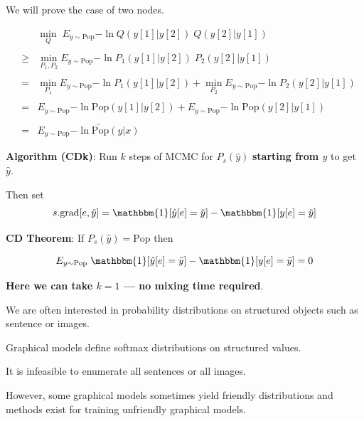 {

We will prove the case of two nodes.

\vfill
\begin{eqnarray*}
  & & \min_Q \;E_{y\sim \mathrm{Pop}}{-\ln Q(y[1]|y[2])\;Q(y[2]|y[1])} \\
  \\
  & \geq & \min_{P_1,P_2} E_{y \sim \mathrm{Pop}}{-\ln P_1(y[1]|y[2])\;P_2(y[2]|y[1])} \\
  \\
  & = & \min_{P_1} E_{y \sim \mathrm{Pop}}{-\ln P_1(y[1]|y[2])} + \min_{P_2} E_{y \sim \mathrm{Pop}}{-\ln P_2(y[2]|y[1])} \\
  \\
  & = & E_{y \sim \mathrm{Pop}}{-\ln \mathrm{Pop}(y[1]|y[2])} + E_{y \sim \mathrm{Pop}}{-\ln \mathrm{Pop}(y[2]|y[1])} \\
  \\
  & = & E_{y \sim \mathrm{Pop}}{-\ln \widetilde{\mathrm{Pop}}(y|x)}
\end{eqnarray*}

  
{\bf Algorithm (CDk)}: Run $k$ steps of MCMC for $P_s(\hat{y})$ {\bf starting from $y$} to get $\hat{y}$.

\vfill
Then set
$$s.\mathrm{grad}[e,\tilde{y}] = \mathbbm{1}[\hat{y}[e] = \tilde{y}] - \mathbbm{1}[y[e]= \tilde{y}]$$

\vfill
    {\bf CD Theorem}: If $P_s(\hat{y}) = \mathrm{Pop}$ then
    
    $$E_{y \sim \mathrm{Pop}}\; \mathbbm{1}[\hat{y}[e] = \tilde{y}] - \mathbbm{1}[y[e]= \tilde{y}] = 0$$

\vfill
{\bf Here we can take $k=1$ --- \bf no mixing time required}.


We are often interested in probability distributions on structured objects such as sentence or images.

\vfill
Graphical models define softmax distributions on structured values.

\vfill
It is infeasible to enumerate all sentences or all images.

\vfill
However, some graphical models sometimes yield friendly distributions and methods exist
for training unfriendly graphical models.

}

